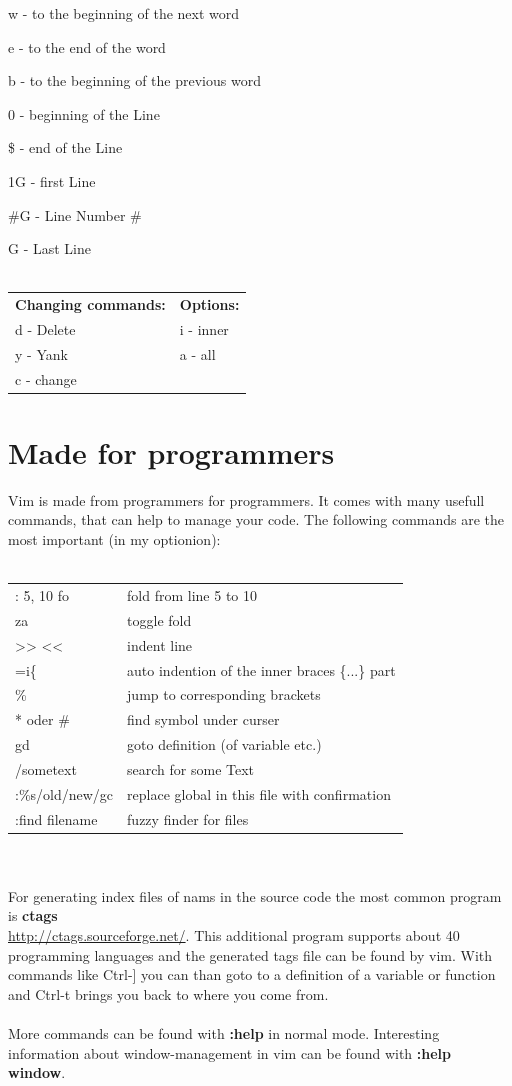 \documentclass[a4paper, 10pt]{scrartcl}
\begin{document}
w 	- to the beginning of the next word

e	- to the end of the word

b 	- to the beginning of the previous word

0	- beginning of the Line

\$ 	- end of the Line

1G	- first Line

\#G	- Line Number \#

G	- Last Line
\\
\\
\begin{tabular}{p{7cm} l}
\textbf{Changing commands:} & \textbf{Options:} \\
d  - Delete & i - inner \\
y  - Yank 	& a - all \\
c  - change & \\
\end{tabular}

\section{Made for programmers}
Vim is made from programmers for programmers. It comes with many usefull commands, that can help to manage your code. The following commands are the most important (in my optionion):
\\
\\
\begin{tabular}{l l}
: 5, 10 fo 	& fold from line 5 to 10 \\
za 	& toggle fold \\
>>    << 	& indent line \\
=i\{	& auto indention of the inner braces \{...\} part \\
\%	& jump to corresponding brackets \\
*   oder   \#	& find symbol under curser \\
gd	& goto definition (of variable etc.) \\
/sometext	& search for some Text \\
:\%s/old/new/gc	& replace global in this file with confirmation \\
:find filename	& fuzzy finder for files \\
\end{tabular}
\\
\\
For generating index files of nams in the source code the most common program is \textbf{ctags}\\
 \href{http://ctags.sourceforge.net/}{http://ctags.sourceforge.net/}. This additional program supports about 40 programming languages and the generated tags file can be found by vim. With commands like Ctrl-] you can than goto to a definition of a variable or function and Ctrl-t brings you back to where you come from.
\\
\\
More commands can be found with \textbf{:help} in normal mode. Interesting information about window-management in vim can be found with \textbf{:help window}.
\end{document}
